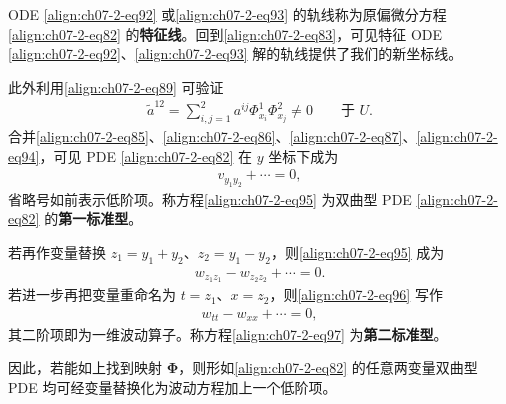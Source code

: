 \documentclass[../../main.tex]{subfiles}
\begin{document}
ODE \eqref{align:ch07-2-eq92} 或\eqref{align:ch07-2-eq93} 的轨线称为原偏微分方程\eqref{align:ch07-2-eq82} 的\textbf{特征线}。回到\eqref{align:ch07-2-eq83}，可见特征 ODE \eqref{align:ch07-2-eq92}、\eqref{align:ch07-2-eq93} 解的轨线提供了我们的新坐标线。

此外利用\eqref{align:ch07-2-eq89} 可验证
\begin{align}
\widetilde{a}^{12}=\sum_{i,j=1}^2 a^{ij}\Phi^1_{x_i}\Phi^2_{x_j}\neq 0\qquad \text{于 } U.\label{align:ch07-2-eq94}
\end{align}
合并\eqref{align:ch07-2-eq85}、\eqref{align:ch07-2-eq86}、\eqref{align:ch07-2-eq87}、\eqref{align:ch07-2-eq94}，可见 PDE \eqref{align:ch07-2-eq82} 在 $y$ 坐标下成为
\begin{align}
v_{y_1y_2}+\cdots=0,\label{align:ch07-2-eq95}
\end{align}
省略号如前表示低阶项。称方程\eqref{align:ch07-2-eq95} 为双曲型 PDE \eqref{align:ch07-2-eq82} 的\textbf{第一标准型}。

若再作变量替换 $z_1=y_1+y_2$、$z_2=y_1-y_2$，则\eqref{align:ch07-2-eq95} 成为
\begin{align}
w_{z_1z_1}-w_{z_2z_2}+\cdots=0.\label{align:ch07-2-eq96}
\end{align}
若进一步再把变量重命名为 $t=z_1$、$x=z_2$，则\eqref{align:ch07-2-eq96} 写作
\begin{align}
w_{tt}-w_{xx}+\cdots=0,\label{align:ch07-2-eq97}
\end{align}
其二阶项即为一维波动算子。称方程\eqref{align:ch07-2-eq97} 为\textbf{第二标准型}。

因此，若能如上找到映射 $\boldsymbol{\Phi}$，则形如\eqref{align:ch07-2-eq82} 的任意两变量双曲型 PDE 均可经变量替换化为波动方程加上一个低阶项。
\end{document}

